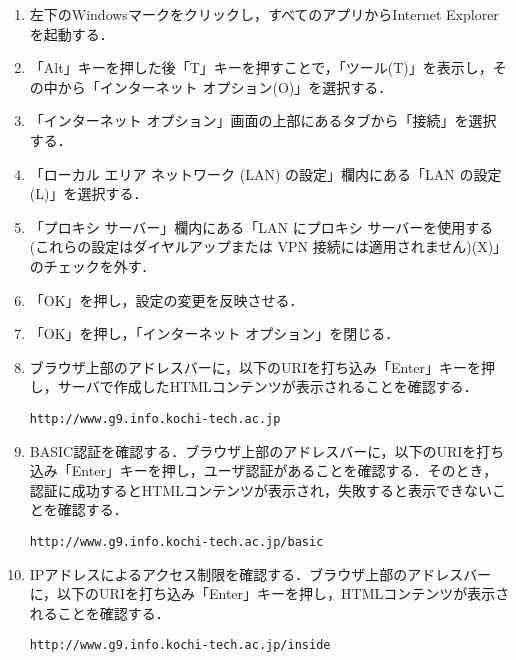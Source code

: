 \documentclass[a4j,titlepage]{jarticle}
\begin{document}
\begin{enumerate}
\item 左下のWindowsマークをクリックし，すべてのアプリからInternet Explorerを起動する．

\item 「Alt」キーを押した後「T」キーを押すことで，「ツール(T)」を表示し，その中から「インターネット オプション(O)」を選択する．

\item 「インターネット オプション」画面の上部にあるタブから「接続」を選択する．

\item 「ローカル エリア ネットワーク (LAN) の設定」欄内にある「LAN の設定(L)」を選択する．

\item 「プロキシ サーバー」欄内にある「LAN にプロキシ サーバーを使用する (これらの設定はダイヤルアップまたは VPN 接続には適用されません)(X)」のチェックを外す．

\item 「OK」を押し，設定の変更を反映させる．

\item 「OK」を押し，「インターネット オプション」を閉じる．

\item ブラウザ上部のアドレスバーに，以下のURIを打ち込み「Enter」キーを押し，サーバで作成したHTMLコンテンツが表示されることを確認する．
\begin{screen}
\begin{center}
\begin{verbatim}
http://www.g9.info.kochi-tech.ac.jp
\end{verbatim}
\end{center}
\end{screen}

\item BASIC認証を確認する．ブラウザ上部のアドレスバーに，以下のURIを打ち込み「Enter」キーを押し，ユーザ認証があることを確認する．そのとき，認証に成功するとHTMLコンテンツが表示され，失敗すると表示できないことを確認する．
\begin{screen}
\begin{center}
\begin{verbatim}
http://www.g9.info.kochi-tech.ac.jp/basic
\end{verbatim}
\end{center}
\end{screen}

\item IPアドレスによるアクセス制限を確認する．ブラウザ上部のアドレスバーに，以下のURIを打ち込み「Enter」キーを押し，HTMLコンテンツが表示されることを確認する．
\begin{screen}
\begin{center}
\begin{verbatim}
http://www.g9.info.kochi-tech.ac.jp/inside
\end{verbatim}
\end{center}
\end{screen}
\end{enumerate}
\end{document}
